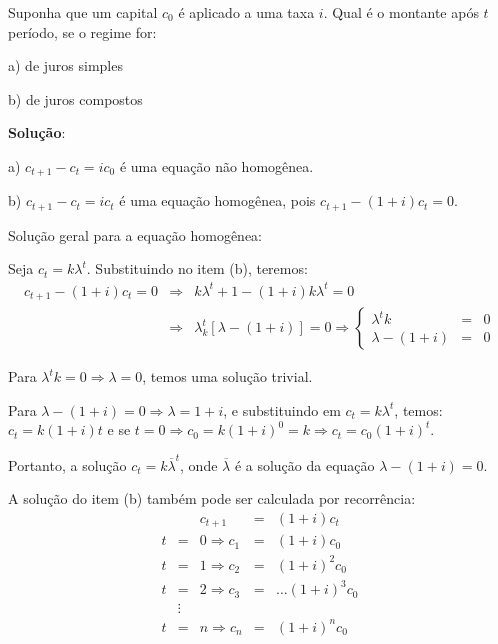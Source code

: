 \begin{example}[Economia]
Suponha que um capital \(c_{0}\) é aplicado a uma taxa \(i\). Qual é o montante após \(t\) período, se o regime for: 

\begin{description}
\item a) de juros simples 
\item b) de juros compostos
\end{description}
\end{example}

\textbf{Solução}:

\begin{description}
\item a) \(c_{t+1} - c_{t} = ic_{0}\) é uma equação não homogênea. 
\item b) \(c_{t+1} - c_{t} = ic_{t}\) é uma equação homogênea, pois \(c_{t+1}-(1+i)c_{t}=0\). 
\end{description}




Solução geral para a equação homogênea:

Seja $c_{t} = k\lambda^{t}$. Substituindo no item (b), teremos:
$$\begin{array}{rcl}
c_{t+1}-(1+i)c_{t} = 0
&\Rightarrow&  k\lambda^{t}+1-(1+i)k\lambda^{t} = 0 \\
&\Rightarrow& \lambda_{k}^{t}[\lambda-(1+i)] = 0
\Rightarrow
\left\{\begin{array}{rcl}
\lambda^{t} k &=& 0 \\
\lambda-(1+i) &=& 0
\end{array}\right.
\end{array}$$

Para $\lambda^{t} k = 0 \Rightarrow  \lambda = 0$, temos uma solução trivial.

Para $\lambda-(1+i)=0 \Rightarrow  \lambda = 1+i$, e substituindo em $c_{t} = k\lambda^{t}$, temos: $c_{t} = k(1 + i)t$ e se $t=0 \Rightarrow c_{0} = k(1+i)^{0} = k \Rightarrow  c_{t} = c_{0} (1+i)^{t}$.

Portanto, a solução $c_{t} = k \overline{\lambda}^{t}$, onde $\overline{\lambda}$ é a solução da equação $\lambda - (1 + i)=0$.

A solução do item (b) também pode ser calculada por recorrência: 
$$\begin{array}{rcrcl}
 & & c_{t+1} &=& (1 + i)c_{t} \\
t &=& 0 \Rightarrow  c_1 &=& (1 + i)c_0 \\
t &=& 1 \Rightarrow  c_2 &=& (1+ i)^2c_0 \\
t &=& 2 \Rightarrow  c_3 &=& \ldots (1+i)^3c_0 \\
&\vdots& && \\
t &=& n \Rightarrow  c_n &=& (1+i)^nc_0
\end{array}$$

